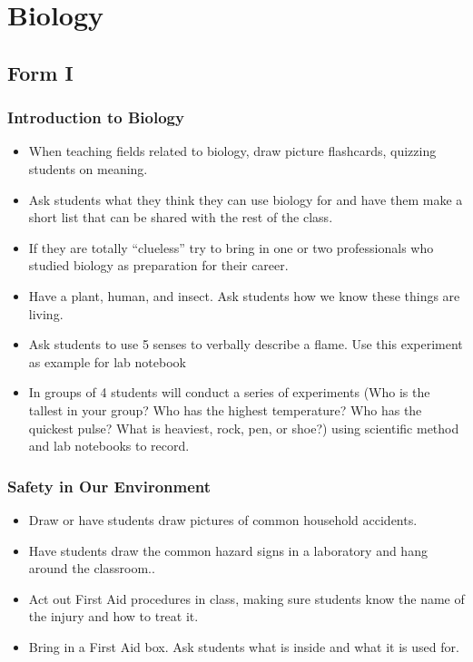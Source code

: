 \section{Biology}
\subsection{Form I}
\subsubsection*{Introduction to Biology}
\begin{itemize}
\item	When teaching fields related to biology, draw picture flashcards, quizzing students on meaning.
\item	Ask students what they think they can use biology for and have them make a short list that can be shared with the rest of the class.
\item	If they are totally ``clueless'' try to bring  in one or two professionals who studied biology as preparation for their career.
\item	Have a plant, human, and insect.  Ask students how we know these things are living.
\item	Ask students to use 5 senses to verbally describe a flame. Use this experiment as example for lab notebook
\item	In groups of 4 students will conduct a series of experiments (Who is the tallest in your group? Who has the highest temperature? Who has the quickest pulse? What is heaviest, rock, pen, or shoe?) using scientific method and lab notebooks to record.
\end{itemize}

\subsubsection{Safety in Our Environment}
\begin{itemize}
\item	Draw or have students draw pictures of common household accidents.
\item	Have students draw the common hazard signs in a laboratory and hang around the classroom..
\item	Act out First Aid procedures in class, making sure students know the name of the injury and how to treat it.
\item	Bring in a First Aid box.  Ask students what is inside and what it is used for.
\end{itemize}

